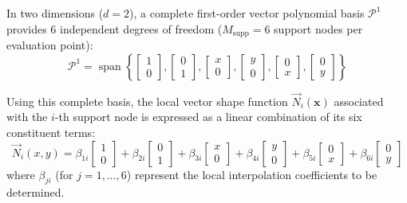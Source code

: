 \documentclass[preprint,12pt]{elsarticle}
\begin{document}
In two dimensions ($d=2$), a complete first-order vector polynomial basis $\mathcal{P}^1$ provides 6 independent degrees of freedom ($M_{\mathrm{supp}} = 6$ support nodes per evaluation point):
\begin{equation}
    \mathcal{P}^1 = \operatorname{span} \left\{
    \begin{bmatrix} 1 \\ 0 \end{bmatrix},
    \begin{bmatrix} 0 \\ 1 \end{bmatrix},
    \begin{bmatrix} x \\ 0 \end{bmatrix},
    \begin{bmatrix} y \\ 0 \end{bmatrix},
    \begin{bmatrix} 0 \\ x \end{bmatrix},
    \begin{bmatrix} 0 \\ y \end{bmatrix}
    \right\}
    \label{eq:complete_P1_basis_vectors}
\end{equation}

Using this complete basis, the local vector shape function $\vec{N}_i(\mathbf{x})$ associated with the $i$-th support node is expressed as a linear combination of its six constituent terms:
\begin{equation}
    \vec{N}_i(x, y) = \beta_{1i} \begin{bmatrix} 1 \\ 0 \end{bmatrix} + \beta_{2i} \begin{bmatrix} 0 \\ 1 \end{bmatrix} + \beta_{3i} \begin{bmatrix} x \\ 0 \end{bmatrix} + \beta_{4i} \begin{bmatrix} y \\ 0 \end{bmatrix} + \beta_{5i} \begin{bmatrix} 0 \\ x \end{bmatrix} + \beta_{6i} \begin{bmatrix} 0 \\ y \end{bmatrix}
    \label{eq:P1_shape_function_expansion}
\end{equation}
where $\beta_{ji}$ (for $j=1, \dots, 6$) represent the local interpolation coefficients to be determined.
\end{document}

